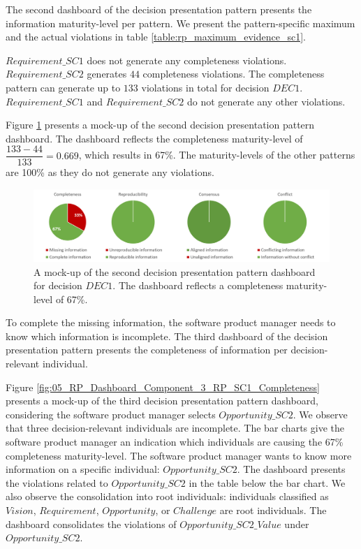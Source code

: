 The second dashboard of the decision presentation pattern presents the information maturity-level per pattern. We present the pattern-specific maximum and the actual violations in table \ref{table:rp_maximum_evidence_sc1}.

$Requirement\_SC1$ does not generate any completeness violations. $Requirement\_SC2$ generates $44$ completeness violations. The completeness pattern can generate up to $133$ violations in total for decision $DEC1$. $Requirement\_SC1$ and $Requirement\_SC2$ do not generate any other violations. 

Figure \ref{fig:05_RP_Dashboard_Component_2_RP_SC1} presents a mock-up of the second decision presentation pattern dashboard. The dashboard reflects the completeness maturity-level of $\dfrac{133-44}{133} = 0.669$, which results in 67\%. The maturity-levels of the other patterns are 100\% as they do not generate any violations.

\begin{figure}[H]
\centering
  \includegraphics[width=17cm]{../../Images/05_Validation/05_RP_Dashboard_Component_2_RP_SC1.png}
  \caption{A mock-up of the second decision presentation pattern dashboard for decision $DEC1$. The dashboard reflects a completeness maturity-level of 67\%.}
  \label{fig:05_RP_Dashboard_Component_2_RP_SC1}
\end{figure}

To complete the missing information, the software product manager needs to know which information is incomplete. The third dashboard of the decision presentation pattern presents the completeness of information per decision-relevant individual.

Figure \ref{fig:05_RP_Dashboard_Component_3_RP_SC1_Completeness} presents a mock-up of the third decision presentation pattern dashboard, considering the software product manager selects $Opportunity\_SC2$. We observe that three decision-relevant individuals are incomplete. The bar charts give the software product manager an indication which individuals are causing the 67\% completeness maturity-level. The software product manager wants to know more information on a specific individual: $Opportunity\_SC2$. The dashboard presents the violations related to $Opportunity\_SC2$ in the table below the bar chart. We also observe the consolidation into root individuals: individuals classified as $Vision$, $Requirement$, $Opportunity$, or $Challenge$ are root individuals. The dashboard consolidates the violations of $Opportunity\_SC2\_Value$ under $Opportunity\_SC2$.

